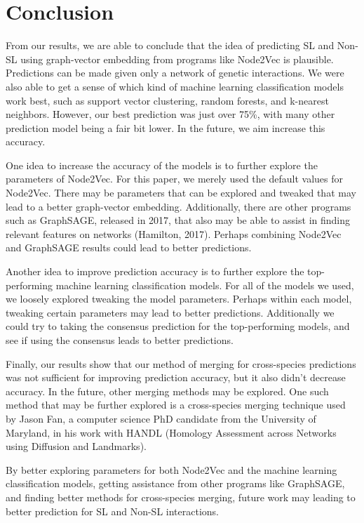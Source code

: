 \section{Conclusion}
\label{sec:conclusion}

From our results, we are able to conclude that the idea of predicting SL and Non-SL using graph-vector embedding from programs like Node2Vec is plausible. Predictions can be made given only a network of genetic interactions. We were also able to get a sense of which kind of machine learning classification models work best, such as support vector clustering, random forests, and k-nearest neighbors. However, our best prediction was just over 75\%, with many other prediction model being a fair bit lower. In the future, we aim increase this accuracy.

One idea to increase the accuracy of the models is to further explore the parameters of Node2Vec. For this paper, we merely used the default values for Node2Vec. There may be parameters that can be explored and tweaked  that may lead to a better graph-vector embedding. Additionally, there are other programs such as GraphSAGE, released in 2017, that also may be able to assist in finding relevant features on networks (Hamilton, 2017). Perhaps combining Node2Vec and GraphSAGE results could lead to better predictions. 

Another idea to improve prediction accuracy is to further explore the top-performing machine learning classification models. For all of the models we used, we loosely explored tweaking the model parameters. Perhaps within each model, tweaking certain parameters may lead to better predictions. Additionally we could try to taking the consensus prediction for the top-performing models, and see if using the consensus leads to better predictions.

Finally, our results show that our method of merging for cross-species predictions was not sufficient for improving prediction accuracy, but it also didn’t decrease accuracy. In the future, other merging methods may be explored. One such method that may be further explored is a cross-species merging technique used by Jason Fan, a computer science PhD candidate from the University of Maryland, in his work with HANDL (Homology Assessment across Networks using Diffusion and Landmarks).

By better exploring parameters for both Node2Vec and the machine learning classification models, getting assistance from other programs like GraphSAGE, and finding better methods for cross-species merging, future work may leading to better prediction for SL and Non-SL interactions.

